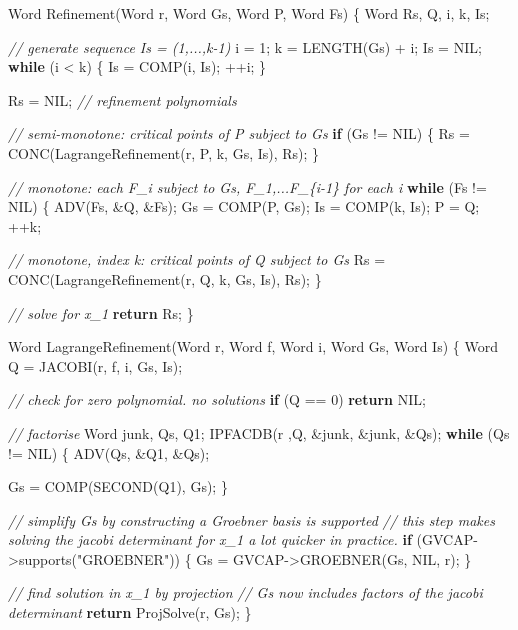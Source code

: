 \documentclass[
]{book}
\newenvironment{Shaded}{\begin{snugshade}}{\end{snugshade}}
\newcommand{\CommentTok}[1]{\textcolor[rgb]{0.56,0.35,0.01}{\textit{#1}}}
\newcommand{\ControlFlowTok}[1]{\textcolor[rgb]{0.13,0.29,0.53}{\textbf{#1}}}
\newcommand{\DecValTok}[1]{\textcolor[rgb]{0.00,0.00,0.81}{#1}}
\newcommand{\NormalTok}[1]{#1}
\newcommand{\StringTok}[1]{\textcolor[rgb]{0.31,0.60,0.02}{#1}}
\theoremstyle{definition}
\theoremstyle{definition}
\theoremstyle{definition}
\theoremstyle{definition}
\theoremstyle{remark}
\begin{document}
\begin{Shaded}
\begin{Highlighting}[numbers=left,,]
\NormalTok{Word Refinement(Word r, Word Gs, Word P, Word Fs)}
\NormalTok{\{}
\NormalTok{    Word Rs, Q, i, k, Is;}

    \CommentTok{// generate sequence Is = (1,...,k{-}1)}
\NormalTok{    i = }\DecValTok{1}\NormalTok{;}
\NormalTok{    k = LENGTH(Gs) + i;}
\NormalTok{    Is = NIL;}
    \ControlFlowTok{while}\NormalTok{ (i \textless{} k) \{}
\NormalTok{        Is = COMP(i, Is);}
\NormalTok{        ++i;}
\NormalTok{    \}}

\NormalTok{    Rs = NIL; }\CommentTok{// refinement polynomials}

    \CommentTok{// semi{-}monotone: critical points of P subject to Gs}
    \ControlFlowTok{if}\NormalTok{ (Gs != NIL) \{}
\NormalTok{        Rs = CONC(LagrangeRefinement(r, P, k, Gs, Is), Rs);}
\NormalTok{    \}}

    \CommentTok{// monotone: each F\_i subject to Gs, F\_1,...F\_\{i{-}1\} for each i}
    \ControlFlowTok{while}\NormalTok{ (Fs != NIL) \{}
\NormalTok{        ADV(Fs, \&Q, \&Fs);}
\NormalTok{        Gs = COMP(P, Gs);}
\NormalTok{        Is = COMP(k, Is);}
\NormalTok{        P = Q;}
\NormalTok{        ++k;}

        \CommentTok{// monotone, index k: critical points of Q subject to Gs}
\NormalTok{        Rs = CONC(LagrangeRefinement(r, Q, k, Gs, Is), Rs);}
\NormalTok{    \}}

    \CommentTok{// solve for x\_1}
    \ControlFlowTok{return}\NormalTok{ Rs;}
\NormalTok{\}}

\NormalTok{Word LagrangeRefinement(Word r, Word f, Word i, Word Gs, Word Is)}
\NormalTok{\{}
\NormalTok{    Word Q = JACOBI(r, f, i, Gs, Is);}

    \CommentTok{// check for zero polynomial. no solutions}
    \ControlFlowTok{if}\NormalTok{ (Q == }\DecValTok{0}\NormalTok{) }\ControlFlowTok{return}\NormalTok{ NIL;}

    \CommentTok{// factorise}
\NormalTok{    Word junk, Qs, Q1;}
\NormalTok{    IPFACDB(r ,Q, \&junk, \&junk, \&Qs);}
    \ControlFlowTok{while}\NormalTok{ (Qs != NIL) \{}
\NormalTok{        ADV(Qs, \&Q1, \&Qs);}

\NormalTok{        Gs = COMP(SECOND(Q1), Gs);}
\NormalTok{    \}}

    \CommentTok{// simplify Gs by constructing a Groebner basis is supported}
    \CommentTok{// this step makes solving the jacobi determinant for x\_1 a lot quicker in practice.}
    \ControlFlowTok{if}\NormalTok{ (GVCAP{-}\textgreater{}supports(}\StringTok{"GROEBNER"}\NormalTok{)) \{}
\NormalTok{        Gs = GVCAP{-}\textgreater{}GROEBNER(Gs, NIL, r);}
\NormalTok{    \}}

    \CommentTok{// find solution in x\_1 by projection}
    \CommentTok{// Gs now includes factors of the jacobi determinant}
    \ControlFlowTok{return}\NormalTok{ ProjSolve(r, Gs);}
\NormalTok{\}}
\end{Highlighting}
\end{Shaded}
\end{document}
